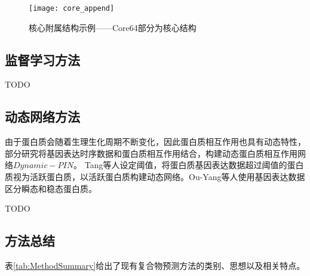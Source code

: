 \begin{figure}[htbp]
  \centering
  \texttt{[image: core\_append]}
  \caption{核心附属结构示例——Core64部分为核心结构}
  \label{fig:core_append}
\end{figure}

\subsection{监督学习方法}
\label{subsection:research:Supervision}

TODO

\subsection{动态网络方法}
\label{subsection:research:Dynamic}

由于蛋白质会随着生理生化周期不断变化，因此蛋白质相互作用也具有动态特性，部分研究\cite{li_dynamic_2017}将基因表达时序数据和蛋白质相互作用结合，构建动态蛋白质相互作用网络$Dynamic-PIN$。
Tang等人\cite{tang_comparison_2011}设定阈值，将蛋白质基因表达数据超过阈值的蛋白质视为活跃蛋白质，以活跃蛋白质构建动态网络。Ou-Yang等人\cite{ou-yang_detecting_2014}使用基因表达数据区分瞬态和稳态蛋白质。

TODO

\subsection{方法总结}
\label{subsection:research:researchSummary}

表\ref{tab:MethodSummary}给出了现有复合物预测方法的类别、思想以及相关特点。

